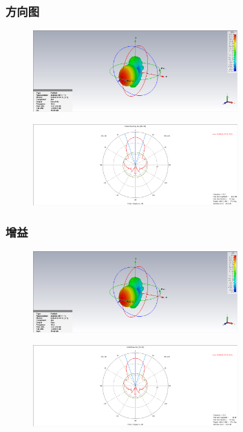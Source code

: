 \documentclass{../source/zjureport}
\begin{document}
            \subsubsection{方向图}
            \begin{figure}[htp]
                \centering
                \includegraphics[width = 0.7\textwidth]{figure/3D方向图.png}
            \end{figure}
            \begin{figure}[htp]
                \centering
                \includegraphics[width = 0.7\textwidth]{figure/polar.png}
            \end{figure}
            \subsubsection{增益}
            \begin{figure}[htp]
                \centering
                \includegraphics[width = 0.7\textwidth]{figure/Gain3D.png}
            \end{figure}
            \newpage
            \begin{figure}[htp]
                \centering
                \includegraphics[width = 0.7\textwidth]{figure/Gainpolar.png}
            \end{figure}
\end{document}
